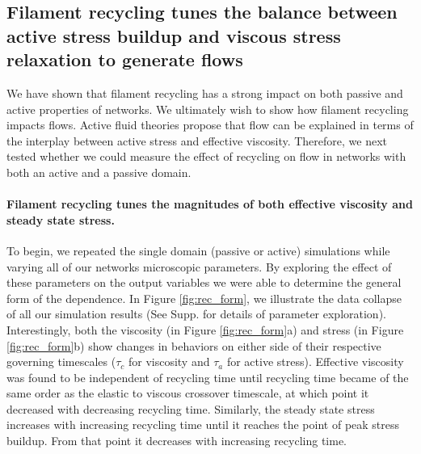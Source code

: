 \documentclass[10pt,letterpaper]{article}
\begin{document}
\subsection*{Filament recycling tunes the balance between active stress buildup and viscous stress relaxation to generate flows}
We have shown that filament recycling has a strong impact on both passive and active properties of networks.  We ultimately wish to show how filament recycling impacts flows.  Active fluid theories propose that flow can be explained in terms of the interplay between active stress and effective viscosity. Therefore, we next tested whether we could measure the effect of recycling on flow in networks with both an active and a passive domain.
 

\paragraph{Filament recycling tunes the magnitudes of both effective viscosity and steady state stress.}  
To begin, we repeated the single domain (passive or active) simulations while varying all of our networks microscopic parameters.   By exploring the effect of these parameters on the output variables we were able to determine the general form of the dependence. In Figure \ref{fig:rec_form}, we illustrate the data collapse of all our simulation results (See Supp. for details of parameter exploration).  Interestingly, both the viscosity (in Figure \ref{fig:rec_form}a) and stress (in Figure \ref{fig:rec_form}b) show changes in behaviors on either side of their respective governing timescales ($\tau_c$ for viscosity and $\tau_a$ for active stress).  Effective viscosity was found to be independent of recycling time until recycling time became of the same order as the elastic to viscous crossover timescale, at which point it decreased with decreasing recycling time.  Similarly, the steady state stress increases with increasing recycling time until it reaches the point of peak stress buildup.  From that point it decreases with increasing recycling time.
\end{document}
